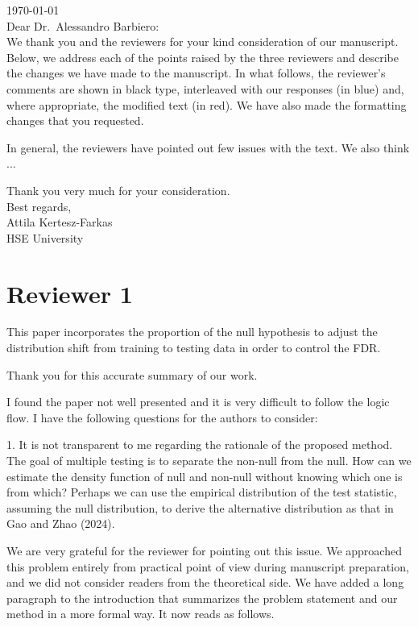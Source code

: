 \documentclass{article}
\newcommand{\response}[1]{\vspace*{1ex} \color{blue} \noindent #1 \color{black}
\vspace*{2ex}}
\begin{document}
	
\noindent
\today\\[2ex]

\noindent
Dear Dr.\ Alessandro Barbiero:\\[2ex]

We thank you and the reviewers for your kind consideration of our manuscript.
Below, we address each of the points raised by the three reviewers and describe the changes we have made to the manuscript.
In what follows, the reviewer's comments are shown in black type, interleaved with our responses (in blue) and, where appropriate, the modified text (in red).
We have also made the formatting changes that you requested.

In general, the reviewers have pointed out few issues with the text. We also think ...

Thank you very much for your consideration.\\[2ex]

\noindent
Best regards,\\[2ex]

\noindent
Attila Kertesz-Farkas\\
HSE University

\clearpage
\section*{Reviewer 1}

This paper incorporates the proportion of the null hypothesis to adjust the distribution shift from training to testing data in order to control the FDR. 

\response{Thank you for this accurate summary of our work.}

I found the paper not well presented and it is very difficult to follow the logic flow. I have the following questions for the authors to consider:

1. It is not transparent to me regarding the rationale of the proposed method. The goal of multiple testing is to separate the non-null from the null. How can we estimate the density function of null and non-null without knowing which one is from which? Perhaps we can use the empirical distribution of the test statistic, assuming the null distribution, to derive the alternative distribution as that in Gao and Zhao (2024).

\response{We are very grateful for the reviewer for pointing out this issue. We approached this problem entirely from practical point of view during manuscript preparation, and we did not consider readers from the theoretical side. We have added a long paragraph to the introduction that summarizes the problem statement and our method in a more formal way. It now reads as follows.}
\end{document}
